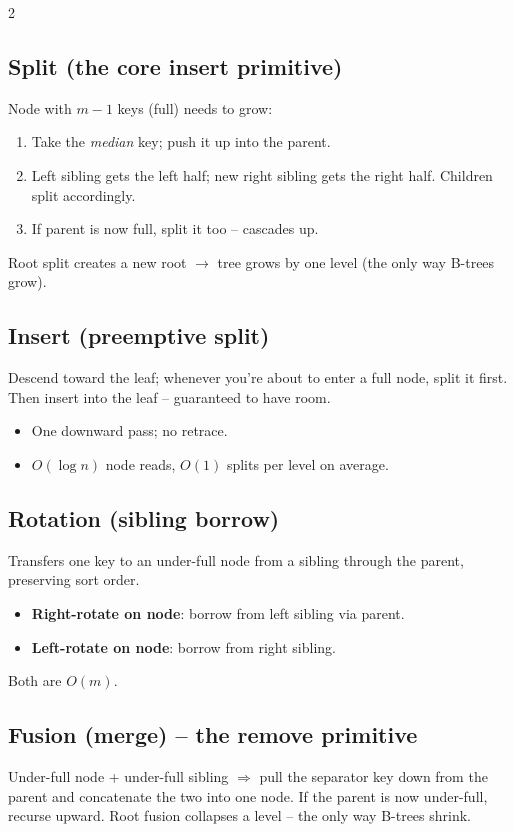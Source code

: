 \documentclass[10pt]{article}
\begin{document}
\begin{multicols}{2}
\subsection*{Split (the core insert primitive)}
Node with $m-1$ keys (full) needs to grow:
\begin{enumerate}
    \item Take the \emph{median} key; push it up into the parent.
    \item Left sibling gets the left half; new right sibling gets the
    right half. Children split accordingly.
    \item If parent is now full, split it too -- cascades up.
\end{enumerate}
Root split creates a new root $\to$ tree grows by one level
(the only way B-trees grow).

\columnbreak

\subsection*{Insert (preemptive split)}
Descend toward the leaf; whenever you're about to enter a full node,
split it first. Then insert into the leaf -- guaranteed to have room.
\begin{itemize}
    \item One downward pass; no retrace.
    \item $O(\log n)$ node reads, $O(1)$ splits per level on average.
\end{itemize}

\subsection*{Rotation (sibling borrow)}
Transfers one key to an under-full node from a sibling through the
parent, preserving sort order.
\begin{itemize}
    \item \textbf{Right-rotate on node}: borrow from left sibling via
    parent.
    \item \textbf{Left-rotate on node}: borrow from right sibling.
\end{itemize}
Both are $O(m)$.

\subsection*{Fusion (merge) -- the remove primitive}
Under-full node + under-full sibling $\Rightarrow$ pull the separator key
down from the parent and concatenate the two into one node.
If the parent is now under-full, recurse upward. Root fusion
collapses a level -- the only way B-trees shrink.


\end{multicols}
\end{document}
